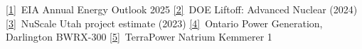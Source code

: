 \href{https://www.eia.gov/outlooks/aeo/}{[1]}~EIA Annual Energy Outlook 2025\quad
\href{https://gain.inl.gov/content/uploads/4/2024/11/DOE-Advanced-Nuclear-Liftoff-Report.pdf}{[2]}~DOE Liftoff: Advanced Nuclear (2024)\quad
\href{https://www.uamps.com/}{[3]}~NuScale Utah project estimate (2023)\quad
\href{https://www.opg.com/}{[4]}~Ontario Power Generation, Darlington BWRX-300\quad
\href{https://www.terrapower.com/}{[5]}~TerraPower Natrium Kemmerer 1
